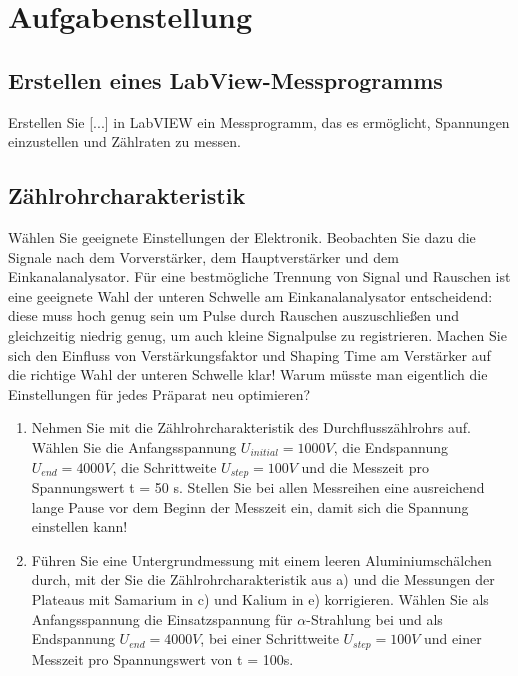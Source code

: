 \section{Aufgabenstellung}

\renewcommand{\labelenumi}{\alph{enumi})}

\subsection{Erstellen eines LabView-Messprogramms}
Erstellen Sie [...] in LabVIEW ein Messprogramm, das es ermöglicht, Spannungen
einzustellen und Zählraten zu messen.

\subsection{Zählrohrcharakteristik}
Wählen Sie geeignete Einstellungen der Elektronik. Beobachten Sie dazu die Signale nach dem Vorverstärker, dem Hauptverstärker und dem Einkanalanalysator. Für eine bestmögliche Trennung von Signal und Rauschen ist eine geeignete Wahl der unteren Schwelle am Einkanalanalysator entscheidend: diese muss hoch genug sein
um Pulse durch Rauschen auszuschließen und gleichzeitig niedrig genug, um auch kleine Signalpulse zu registrieren. Machen Sie sich den Einfluss von Verstärkungsfaktor und Shaping Time am Verstärker auf die richtige Wahl der unteren Schwelle klar! Warum müsste man eigentlich die Einstellungen für jedes Präparat neu optimieren?
\begin{enumerate}
 \item Nehmen Sie mit  die Zählrohrcharakteristik des Durchflusszählrohrs auf.
Wählen Sie die Anfangsspannung $U_{initial} = 1000 V$, die Endspannung $U_{end} = 4000 V$, die Schrittweite $U_{step} = 100 V$ und die Messzeit pro Spannungswert t = 50 s. Stellen Sie bei allen Messreihen eine ausreichend lange Pause vor dem Beginn der Messzeit ein, damit sich die Spannung einstellen kann!

\item Führen Sie eine Untergrundmessung mit einem leeren Aluminiumschälchen durch, mit der Sie die Zählrohrcharakteristik aus a) und die Messungen der Plateaus mit Samarium in c) und Kalium in e) korrigieren. Wählen Sie als Anfangsspannung die Einsatzspannung für $\alpha$-Strahlung bei  und als Endspannung $U_{end} = 4000 V$, bei einer Schrittweite $U_{step} = 100 V$ und einer Messzeit pro Spannungswert von t = 100s.

\end{enumerate}

